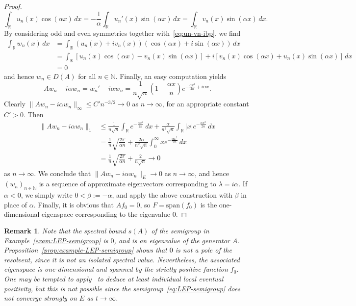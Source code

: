 \documentclass[sn-mathphys]{sn-jnl}%
\theoremstyle{thmstyleone}
\theoremstyle{thmstylethree}
\newtheorem{remark}[theorem]{Remark}
\newcommand{\NN}{\mathbb{N}}
\newcommand{\RR}{\mathbb{R}}
\begin{document}
\begin{proof}
	\begin{equation}
		\label{eq:un-vn-ibp}
		\int_\RR u_n(x)\cos(\alpha x) \,dx = -\frac{1}{\alpha} \int_\RR u_n'(x) \sin(\alpha x) \,dx = \int_\RR v_n(x)\sin(\alpha x)\,dx.
	\end{equation}
	By considering odd and even symmetries together with~\eqref{eq:un-vn-ibp}, we find
	\begin{align*}
		\int_\RR w_n(x) \,dx &= \int_\RR (u_n(x) + iv_n(x))(\cos(\alpha x)+i\sin(\alpha x)) \,dx \\
		&= \int_\RR [u_n(x)\cos(\alpha x) - v_n(x)\sin(\alpha x)] + i[v_n(x)\cos(\alpha x)+u_n(x)\sin(\alpha x)] \,dx \\
		&= 0
	\end{align*}
	and hence $w_n \in D(A)$ for all $n\in\NN$. Finally, an easy computation yields
	\begin{equation*}
		Aw_n - i\alpha w_n = w_n' - i\alpha w_n = \frac{1}{n\sqrt{n}}\left(1-\frac{\alpha x}{n}\right) e^{-\frac{\alpha x^2}{2n}+i\alpha x}.
	\end{equation*}
	Clearly $\|Aw_n - i\alpha w_n\|_\infty \le C'n^{-3/2} \to 0$ as $n\to\infty$, for an appropriate constant $C'>0$. Then
	\begin{align*}
		\|Aw_n - i\alpha w_n\|_1 &\le \frac{1}{n\sqrt{n}}\int_\RR e^{-\frac{\alpha x^2}{2n}} \,dx + \frac{\alpha}{n^2\sqrt{n}}\int_\RR \lvert x\rvert e^{-\frac{\alpha x^2}{2n}} \,dx \\
		&= \frac{1}{n}\sqrt{\frac{2\pi}{\alpha n}} + \frac{2\alpha}{n^2\sqrt{n}}\int_0^\infty xe^{-\frac{\alpha x^2}{2n}} \,dx \\
		&= \frac{1}{n}\sqrt{\frac{2\pi}{\alpha n}} + \frac{2}{n\sqrt{n}} \longrightarrow 0
	\end{align*}
	as $n\to\infty$. We conclude that $\|Aw_n - i\alpha w_n\|_E \to 0$ as $n\to\infty$, and hence $(w_n)_{n\in\NN}$ is a sequence of approximate eigenvectors corresponding to $\lambda=i\alpha$. If $\alpha<0$, we simply write $0<\beta:=-\alpha$, and apply the above construction with $\beta$ in place of $\alpha$. Finally, it is obvious that $Af_0 = 0$, so $F = \mathrm{span}(f_0)$ is the one-dimensional eigenspace corresponding to the eigenvalue 0.
\end{proof}

\begin{remark}
	Note that the spectral bound $s(A)$ of the semigroup in Example~\ref{exam:LEP-semigroup} is $0$, and is an eigenvalue of the generator $A$. Proposition~\ref{prop:example-LEP-semigroup} shows that $0$ is not a pole of the resolvent, since it is not an isolated spectral value. Nevertheless, the associated eigenspace is one-dimensional and spanned by the strictly positive function $f_0$. One may be tempted to apply~\cite[Theorem 3.3]{Ar21} to deduce at least individual local eventual positivity, but this is not possible since the semigroup~\eqref{eq:LEP-semigroup} does not converge strongly on $E$ as $t\to\infty$.
\end{remark}
\end{document}
